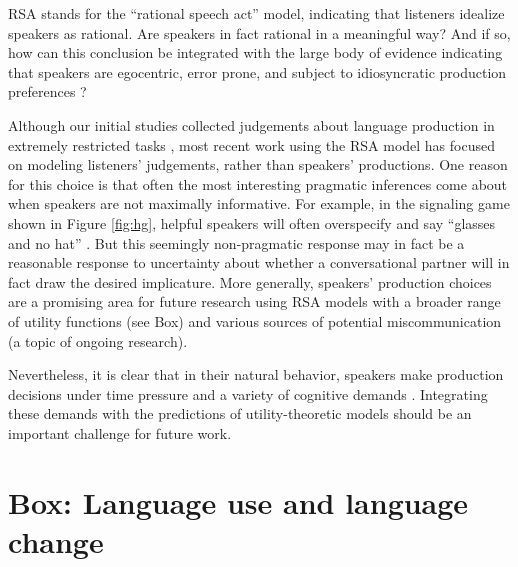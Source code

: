 \documentclass[]{elsarticle}
\begin{document}
RSA stands for the ``rational speech act'' model, indicating that listeners idealize speakers as rational.
Are speakers in fact rational in a meaningful way? And if so, how can this conclusion be
integrated with the large body of evidence indicating that speakers are
egocentric, error prone, and subject to idiosyncratic production
preferences \citep{keysar2003,lane2006,gatt2013}?

Although our initial studies collected judgements about language
production in extremely restricted tasks \citep{frank2012}, most
recent work using the RSA model has focused on modeling listeners'
judgements, rather than speakers' productions. One reason for this
choice is that often the most interesting pragmatic inferences come
about when speakers are not maximally informative. For example, in the
signaling game shown in Figure \ref{fig:hg}, helpful speakers will often
overspecify and say ``glasses and no hat'' \citep{baumann2014}. But this seemingly non-pragmatic response may in fact be a
reasonable response to uncertainty about whether a conversational
partner will in fact draw the desired implicature.
%
More generally, speakers' production choices are a promising area for
future research using RSA models with a broader range of utility
functions (see Box) and various sources of potential miscommunication (a topic of ongoing research).


Nevertheless, it is clear that in their natural behavior, speakers make
production decisions under time pressure and a variety of cognitive
demands \citep{levelt1993}. Integrating these demands with the predictions of
utility-theoretic models should be an important challenge for future
work.

\section{Box: Language use and language
change}\label{box-language-use-and-language-change}
\end{document}
